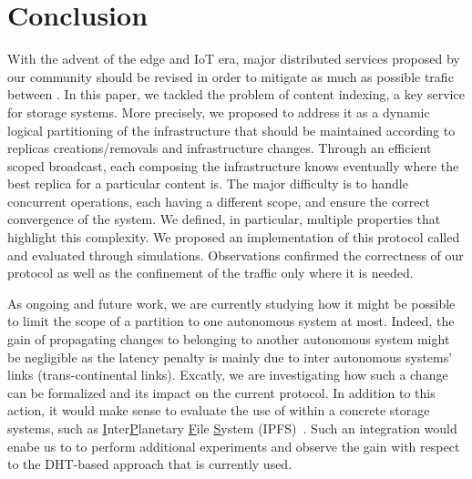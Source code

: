 \section{Conclusion}
\label{sec:conclusion}

With the advent of the edge and IoT era, major distributed services
proposed by our community should be revised in order to mitigate as
much as possible trafic between \processes.  In this paper, we tackled
the problem of content indexing, a key service for storage systems.
%
More precisely, we proposed to address it as a dynamic logical partitioning of the infrastructure
that should be maintained according to replicas creations/removals and
infrastructure changes. Through an efficient scoped broadcast, each
\process composing the infrastructure knows eventually where the best
replica for a particular content is. The major difficulty is to handle
concurrent operations, each having a different scope, and ensure the
correct convergence of the system.
We defined, in particular,  multiple properties that highlight this complexity.
%
We proposed an implementation of this protocol called \NAME and
evaluated through simulations. Observations confirmed the
correctness of our protocol as well as the confinement of the traffic
only where it is needed.

As ongoing and future work, we are currently studying how it might be
possible to limit the scope of a partition to one autonomous system at
most. Indeed, the gain of propagating changes to \processes belonging to
another autonomous system might be negligible as the latency penalty
is mainly due to inter autonomous systems' links (\eg trans-continental
links).  Excatly, we are investigating how such a change can be
formalized and its impact on the current protocol.
%
%
In addition to this action, it would make sense to evaluate the use of \NAME
within a concrete storage systems, such as
\underline{I}nter\underline{P}lanetary \underline{F}ile
\underline{S}ystem (IPFS)~\cite{henningsen2020mapping}.  Such an
integration would enabe us to to perform additional experiments and
observe the gain with respect to the DHT-based approach that is
currently used.

